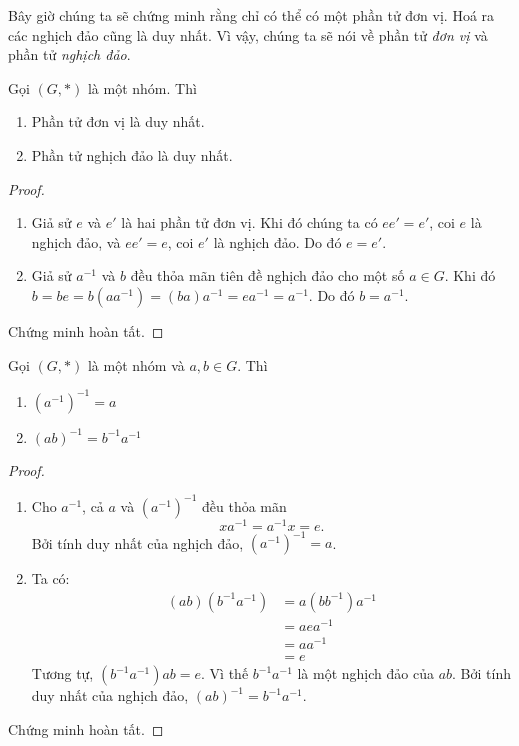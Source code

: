 Bây giờ chúng ta sẽ chứng minh rằng chỉ có thể có một phần tử đơn vị. Hoá ra các nghịch đảo cũng là duy nhất. Vì vậy, chúng ta sẽ nói về phần tử \emph{đơn vị} và phần tử \emph{nghịch đảo}.
\begin{prop}
  Gọi $(G, *)$ là một nhóm. Thì
  \begin{enumerate}[label=(\roman{*})]
    \item Phần tử đơn vị là duy nhất.
    \item Phần tử nghịch đảo là duy nhất.
  \end{enumerate}
\end{prop}
\begin{proof}\leavevmode
  \begin{enumerate}[label=(\roman{*})]
    \item Giả sử $e$ và $e'$ là hai phần tử đơn vị. Khi đó chúng ta có $ee' = e'$, coi $e$ là nghịch đảo, và $ee' = e$, coi $e'$ là nghịch đảo. Do đó $e = e'$.
    \item Giả sử $a^{-1}$ và $b$ đều thỏa mãn tiên đề nghịch đảo cho một số $a\in G$. Khi đó $b = be = b(aa^{-1}) = (ba)a^{-1} = ea^{-1} = a^{-1}$. Do đó $b = a^{-1}$.\qedhere
  \end{enumerate}
  Chứng minh hoàn tất.
\end{proof}
\begin{prop}
  Gọi $(G, *)$ là một nhóm và $a, b\in G$. Thì
  \begin{enumerate}
    \item $(a^{-1})^{-1} = a$
    \item $(ab)^{-1} = b^{-1}a^{-1}$
  \end{enumerate}
\end{prop}
\begin{proof}\leavevmode
  \begin{enumerate}
    \item Cho $a^{-1}$, cả $a$ và $(a^{-1})^{-1}$ đều thỏa mãn
      \[
        xa^{-1} = a^{-1}x = e.
      \]
      Bởi tính duy nhất của nghịch đảo, $(a^{-1})^{-1} = a$.
    \item Ta có:
      \begin{align*}
        (ab)(b^{-1}a^{-1}) &= a(bb^{-1})a^{-1} \\
        &= aea^{-1}\\
        &= aa^{-1}\\
        &= e
      \end{align*}
      Tương tự, $(b^{-1}a^{-1})ab = e$. Vì thế $b^{-1}a^{-1}$ là một nghịch đảo của $ab$. Bởi tính duy nhất của nghịch đảo, $(ab)^{-1} = b^{-1}a^{-1}$.\qedhere
  \end{enumerate}
  Chứng minh hoàn tất.
\end{proof}

